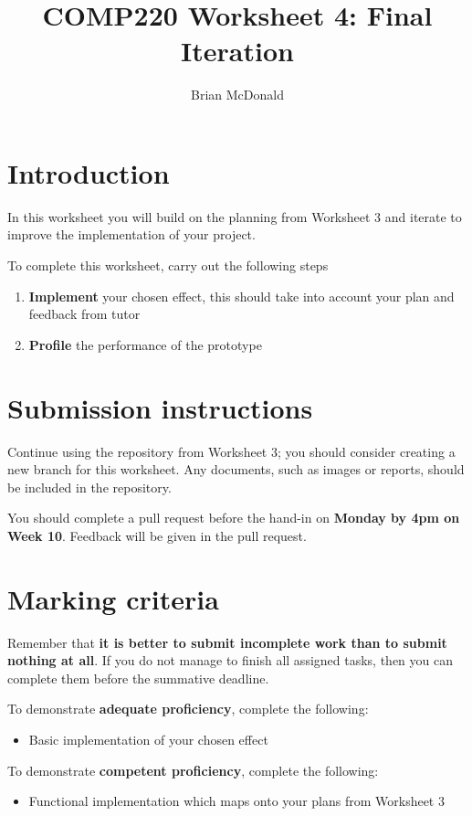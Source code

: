 \documentclass{../../../fal_assignment}
\title{COMP220 Worksheet 4: Final Iteration}
\author{Brian McDonald}
\begin{document}
\maketitle

\section*{Introduction}

In this worksheet you will build on the planning from Worksheet 3 and iterate to improve the implementation of your project.

To complete this worksheet, carry out the following steps
\begin{enumerate}[label=(\alph*)]
	\item \textbf{Implement} your chosen effect, this should take into account your plan and feedback from tutor
	\item \textbf{Profile} the performance of the prototype
\end{enumerate}

\section*{Submission instructions}

Continue using the repository from Worksheet 3; you should consider creating a new branch for this worksheet. Any documents, such as images or reports, should be included in the repository.

You should complete a pull request before the hand-in on \textbf{Monday by 4pm on Week 10}. Feedback will be given in the pull request.

\section*{Marking criteria}

Remember that \textbf{it is better to submit incomplete work than to submit nothing at all}. If you do not manage to finish all assigned tasks, then you can complete them before the summative deadline.

To demonstrate \textbf{adequate proficiency}, complete the following:
\begin{itemize}
	\item Basic implementation of your chosen effect
\end{itemize} 

To demonstrate \textbf{competent proficiency}, complete the following:
\begin{itemize}
	\item Functional implementation which maps onto your plans from Worksheet 3
\end{itemize}
\end{document}
